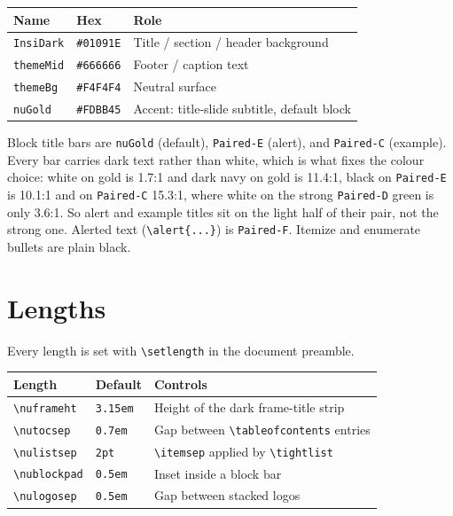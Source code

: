 \documentclass[a4paper,11pt]{article}
\begin{document}
\begin{center}
	\renewcommand{\arraystretch}{1.3}
	\begin{tabular}{lll}
		\toprule
		Name              & Hex               & Role                                        \\
		\midrule
		\texttt{InsiDark} & \texttt{\#01091E} & Title / section / header background         \\
		\texttt{themeMid} & \texttt{\#666666} & Footer / caption text                       \\
		\texttt{themeBg}  & \texttt{\#F4F4F4} & Neutral surface                             \\
		\texttt{nuGold}   & \texttt{\#FDBB45} & Accent: title-slide subtitle, default block \\
		\bottomrule
	\end{tabular}
\end{center}

Block title bars are \texttt{nuGold} (default), \texttt{Paired-E} (alert), and
\texttt{Paired-C} (example).  Every bar carries dark text rather than white,
which is what fixes the colour choice: white on gold is 1.7:1 and dark navy on
gold is 11.4:1, black on \texttt{Paired-E} is 10.1:1 and on \texttt{Paired-C}
15.3:1, where white on the strong \texttt{Paired-D} green is only 3.6:1.  So
alert and example titles sit on the light half of their pair, not the strong
one.  Alerted text (\verb|\alert{...}|) is \texttt{Paired-F}.  Itemize and
enumerate bullets are plain black.

\section{Lengths}

Every length is set with \verb|\setlength| in the document preamble.

\begin{center}
	\renewcommand{\arraystretch}{1.3}
	\begin{tabular}{lll}
		\toprule
		Length                & Default            & Controls                                     \\
		\midrule
		\verb|\nuframeht|     & \texttt{3.15em}    & Height of the dark frame-title strip         \\
		\verb|\nutocsep|      & \texttt{0.7em}     & Gap between \verb|\tableofcontents| entries  \\
		\verb|\nulistsep|     & \texttt{2pt}       & \verb|\itemsep| applied by \verb|\tightlist| \\
		\verb|\nublockpad|    & \texttt{0.5em}     & Inset inside a block bar                     \\
		\verb|\nulogosep|     & \texttt{0.5em}     & Gap between stacked logos                    \\
		\bottomrule
	\end{tabular}
\end{center}
\end{document}
